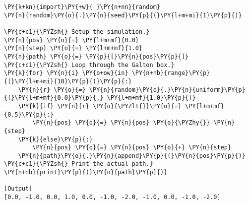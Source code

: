 \begin{Verbatim}[label=\makebox{\href{https://github.com/unipi-physics-labs/statnotes/tree/main/snippy/galton_box.py}{https://github.com/.../galton\_box.py}},commandchars=\\\{\}]
\PY{k+kn}{import}\PY{+w}{ }\PY{n+nn}{random}
\PY{n}{random}\PY{o}{.}\PY{n}{seed}\PY{p}{(}\PY{l+m+mi}{1}\PY{p}{)}

\PY{c+c1}{\PYZsh{} Setup the simulation.}
\PY{n}{pos} \PY{o}{=} \PY{l+m+mf}{0.0}
\PY{n}{step} \PY{o}{=} \PY{l+m+mf}{1.0}
\PY{n}{path} \PY{o}{=} \PY{p}{[}\PY{n}{pos}\PY{p}{]}
\PY{c+c1}{\PYZsh{} Loop through the Galton box.}
\PY{k}{for} \PY{n}{i} \PY{o+ow}{in} \PY{n+nb}{range}\PY{p}{(}\PY{l+m+mi}{10}\PY{p}{)}\PY{p}{:}
    \PY{n}{r} \PY{o}{=} \PY{n}{random}\PY{o}{.}\PY{n}{uniform}\PY{p}{(}\PY{l+m+mf}{0.0}\PY{p}{,} \PY{l+m+mf}{1.0}\PY{p}{)}
    \PY{k}{if} \PY{n}{r} \PY{o}{\PYZlt{}}\PY{o}{=} \PY{l+m+mf}{0.5}\PY{p}{:}
        \PY{n}{pos} \PY{o}{=} \PY{n}{pos} \PY{o}{\PYZhy{}} \PY{n}{step}
    \PY{k}{else}\PY{p}{:}
        \PY{n}{pos} \PY{o}{=} \PY{n}{pos} \PY{o}{+} \PY{n}{step}
    \PY{n}{path}\PY{o}{.}\PY{n}{append}\PY{p}{(}\PY{n}{pos}\PY{p}{)}
\PY{c+c1}{\PYZsh{} Print the actual path.}
\PY{n+nb}{print}\PY{p}{(}\PY{n}{path}\PY{p}{)}

[Output]
[0.0, -1.0, 0.0, 1.0, 0.0, -1.0, -2.0, -1.0, 0.0, -1.0, -2.0]
\end{Verbatim}
